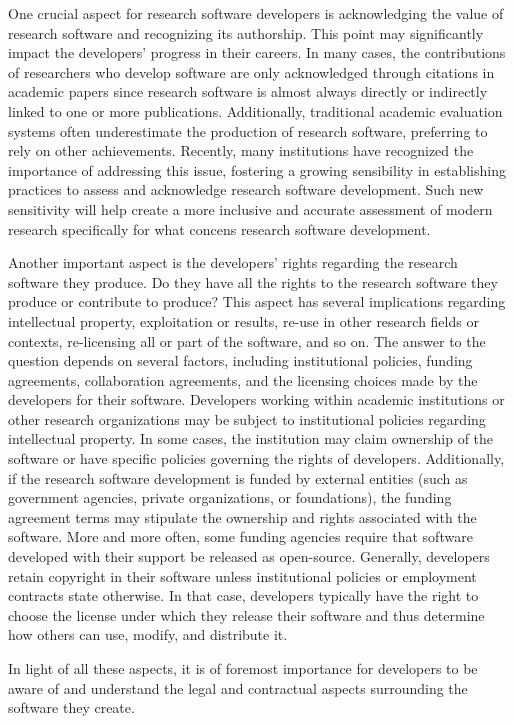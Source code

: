 One crucial aspect for research software developers is acknowledging the value of research software and recognizing its authorship. This point may significantly impact the developers' progress in their careers. In many cases, the contributions of researchers who develop software are only acknowledged through citations in academic papers since research software is almost always directly or indirectly linked to one or more publications. 
Additionally, traditional academic evaluation systems often underestimate the production of research software, preferring to rely on other achievements. Recently, many institutions have recognized the importance of addressing this issue, fostering a growing sensibility in establishing practices to assess and acknowledge research software development. Such new sensitivity will help create a more inclusive and accurate assessment of modern research specifically for what concens research software development. 

Another important aspect is the developers' rights regarding the research software they produce. Do they have all the rights to the research software they produce or contribute to produce? This aspect has several implications regarding intellectual property, exploitation or results, re-use in other research fields or contexts, re-licensing all or part of the software, and so on. The answer to the question depends on several factors, including institutional policies, funding agreements, collaboration agreements, and the licensing choices made by the developers for their software. Developers working within academic institutions or other research organizations may be subject to institutional policies regarding intellectual property. In some cases, the institution may claim ownership of the software or have specific policies governing the rights of developers. 
Additionally, if the research software development is funded by external entities (such as government agencies, private organizations, or foundations), the funding agreement terms may stipulate the ownership and rights associated with the software. More and more often, some funding agencies require that software developed with their support be released as open-source.
Generally, developers retain copyright in their software unless institutional policies or employment contracts state otherwise. In that case, developers typically have the right to choose the license under which they release their software and thus determine how others can use, modify, and distribute it.

In light of all these aspects, it is of foremost importance for developers to be aware of and understand the legal and contractual aspects surrounding the software they create. 


